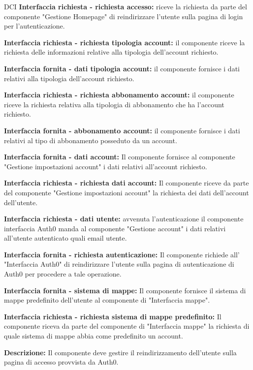 \begin{listaPersonale}{DCI}
    \textbf{Interfaccia richiesta - richiesta accesso:} riceve la richiesta da parte del componente "Gestione Homepage" di reindirizzare l'utente sulla pagina di login per l'autenticazione.

    \textbf{Interfaccia richiesta - richiesta tipologia account:} il componente riceve la richiesta delle informazioni relative alla tipologia dell'account richiesto.

    \textbf{Interfaccia fornita - dati tipologia account:} il componente fornisce i dati relativi alla tipologia dell'account richiesto.

    \textbf{Interfaccia richiesta - richiesta abbonamento account:} il componente riceve la richiesta relativa alla tipologia di abbonamento che ha l'account richiesto.

    \textbf{Interfaccia fornita - abbonamento account:} il componente fornisce i dati relativi al tipo di abbonamento posseduto da un account.

    \textbf{Interfaccia fornita - dati account:} Il componente fornisce al componente "Gestione impostazioni account" i dati relativi all'account richiesto.

    \textbf{Interfaccia richiesta - richiesta dati account:} Il componente riceve da parte del componente "Gestione impostazioni account" la richiesta dei dati dell'account dell'utente.

    \textbf{Interfaccia richiesta - dati utente:} avvenuta l'autenticazione il componente interfaccia Auth0 manda al componente "Gestione account" i dati relativi all'utente autenticato quali email utente.

    \textbf{Interfaccia fornita - richiesta autenticazione:} Il componente richiede all' "Interfaccia Auth0" di reindirizzare l'utente sulla pagina di autenticazione di Auth0 per procedere a tale operazione.

    \textbf{Interfaccia fornita - sistema di mappe:} Il componente fornisce il sistema di mappe predefinito dell'utente al componente di "Interfaccia mappe".

    \textbf{Interfaccia richiesta - richiesta sistema di mappe predefinito:} Il componente riceva da parte del componente di "Interfaccia mappe" la richiesta di quale sistema di mappe abbia come predefinito un account.



    \textbf{Descrizione:} Il componente deve gestire il reindirizzamento dell'utente sulla pagina di accesso provvista da Auth0.


\end{listaPersonale}
